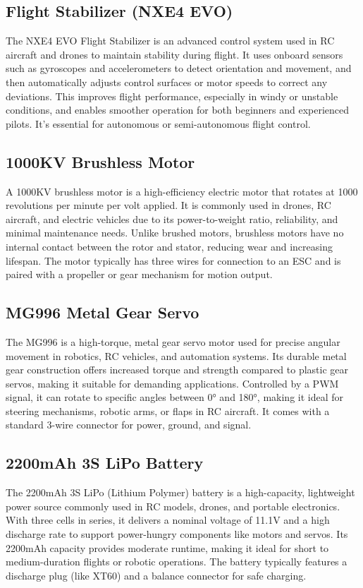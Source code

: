 \subsection{Flight Stabilizer (NXE4 EVO)}
The NXE4 EVO Flight Stabilizer is an advanced control system used in RC aircraft and drones to maintain stability during flight. It uses onboard sensors such as gyroscopes and accelerometers to detect orientation and movement, and then automatically adjusts control surfaces or motor speeds to correct any deviations. This improves flight performance, especially in windy or unstable conditions, and enables smoother operation for both beginners and experienced pilots. It's essential for autonomous or semi-autonomous flight control.

\subsection{1000KV Brushless Motor}
A 1000KV brushless motor is a high-efficiency electric motor that rotates at 1000 revolutions per minute per volt applied. It is commonly used in drones, RC aircraft, and electric vehicles due to its power-to-weight ratio, reliability, and minimal maintenance needs. Unlike brushed motors, brushless motors have no internal contact between the rotor and stator, reducing wear and increasing lifespan. The motor typically has three wires for connection to an ESC and is paired with a propeller or gear mechanism for motion output.

\subsection{MG996 Metal Gear Servo}
The MG996 is a high-torque, metal gear servo motor used for precise angular movement in robotics, RC vehicles, and automation systems. Its durable metal gear construction offers increased torque and strength compared to plastic gear servos, making it suitable for demanding applications. Controlled by a PWM signal, it can rotate to specific angles between 0° and 180°, making it ideal for steering mechanisms, robotic arms, or flaps in RC aircraft. It comes with a standard 3-wire connector for power, ground, and signal.

\subsection{2200mAh 3S LiPo Battery}
The 2200mAh 3S LiPo (Lithium Polymer) battery is a high-capacity, lightweight power source commonly used in RC models, drones, and portable electronics. With three cells in series, it delivers a nominal voltage of 11.1V and a high discharge rate to support power-hungry components like motors and servos. Its 2200mAh capacity provides moderate runtime, making it ideal for short to medium-duration flights or robotic operations. The battery typically features a discharge plug (like XT60) and a balance connector for safe charging.

